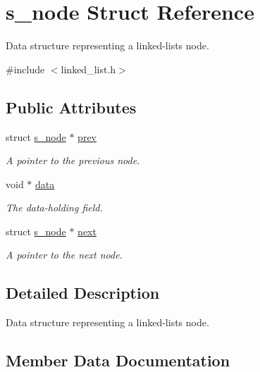 \hypertarget{structs__node}{}\section{s\+\_\+node Struct Reference}
\label{structs__node}


Data structure representing a linked-\/list\textquotesingle{}s node.  




{\ttfamily \#include $<$linked\+\_\+list.\+h$>$}

\subsection*{Public Attributes}
\begin{DoxyCompactItemize}
\item 
struct \hyperlink{structs__node}{s\+\_\+node} $\ast$ \hyperlink{structs__node_ae95cd17e93d1c2de3174acef62c8dce1}{prev}
\begin{DoxyCompactList}\small\item\em A pointer to the previous node. \end{DoxyCompactList}\item 
void $\ast$ \hyperlink{structs__node_af05a0c09cfc8a99893586d311aeb47ea}{data}
\begin{DoxyCompactList}\small\item\em The data-\/holding field. \end{DoxyCompactList}\item 
struct \hyperlink{structs__node}{s\+\_\+node} $\ast$ \hyperlink{structs__node_ac2237e21194d385a2f3d6bd5fdca8045}{next}
\begin{DoxyCompactList}\small\item\em A pointer to the next node. \end{DoxyCompactList}\end{DoxyCompactItemize}


\subsection{Detailed Description}
Data structure representing a linked-\/list\textquotesingle{}s node. 

\subsection{Member Data Documentation}
\mbox{\label{structs__node_af05a0c09cfc8a99893586d311aeb47ea}} 
